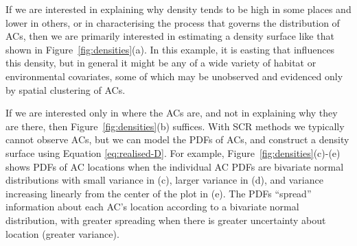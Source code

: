 \documentclass[useAMS,usenatbib,referee]{biom}
\begin{document}
If we are interested in explaining why density tends to be high in some places and lower in others, or in characterising the process that governs the distribution of ACs, then we are primarily interested in estimating a density surface like that shown in Figure~\ref{fig:densities}(a). In this example, it is easting that influences this density, but in general it might be any of a wide variety of habitat or environmental covariates, some of which may be unobserved and evidenced only by spatial clustering of ACs. 

If we are interested only in where the ACs are, and not in explaining why they are there, then Figure~\ref{fig:densities}(b) suffices. With SCR methods we typically cannot observe ACs, but we can model the PDFs of ACs, and construct a density surface using Equation \eqref{eq:realised-D}. For example, Figure~\ref{fig:densities}(c)-(e) shows PDFs of AC locations when the individual AC PDFs are bivariate normal distributions with small variance in (c), larger variance in (d), and variance increasing linearly from the center of the plot in (e). The PDFs ``spread'' information about each AC's location according to a bivariate normal distribution, with greater spreading when there is greater uncertainty about location (greater variance).

\end{document}
